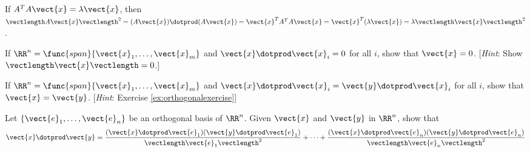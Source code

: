 \begin{multicols}{2}
\begin{ex}
\begin{sol}
If $A^{T}A\vect{x} = \lambda\vect{x}$, then $\vectlength A\vect{x}\vectlength^{2} = (A\vect{x}) \dotprod (A\vect{x}) = \vect{x}^{T}A^{T}A\vect{x} = \vect{x}^{T}(\lambda\vect{x}) = \lambda\vectlength\vect{x}\vectlength^{2}$.
\end{sol}
\end{ex}

\begin{ex}\label{ex:orthogonalexercise}
If $\RR^n = \func{span}\{\vect{x}_{1}, \dots, \vect{x}_{m}\}$ and \newline $\vect{x} \dotprod \vect{x}_{i} = 0$ for all $i$, show that $\vect{x} = 0$. [\textit{Hint}: Show $\vectlength\vect{x}\vectlength = 0$.]
\end{ex}

\begin{ex}
If $\RR^n = \func{span}\{\vect{x}_{1}, \dots, \vect{x}_{m}\}$ and $\vect{x} \dotprod \vect{x}_{i} = \vect{y} \dotprod \vect{x}_{i}$ for all $i$, show that $\vect{x} = \vect{y}$. [\textit{Hint}: Exercise \ref{ex:orthogonalexercise}]
\end{ex}

\begin{ex}
Let $\{\vect{e}_{1}, \dots, \vect{e}_{n}\}$ be an orthogonal basis of $\RR^n$. Given $\vect{x}$ and $\vect{y}$ in $\RR^n$, show that
\begin{equation*}
\vect{x} \dotprod \vect{y} = \frac{(\vect{x} \dotprod \vect{e}_1)(\vect{y} \dotprod \vect{e}_1)}{\vectlength\vect{e}_1\vectlength^2} +
\dots +
\frac{(\vect{x} \dotprod \vect{e}_n)(\vect{y} \dotprod \vect{e}_n)}{\vectlength\vect{e}_n\vectlength^2}
\end{equation*}
\end{ex}
\end{multicols}
